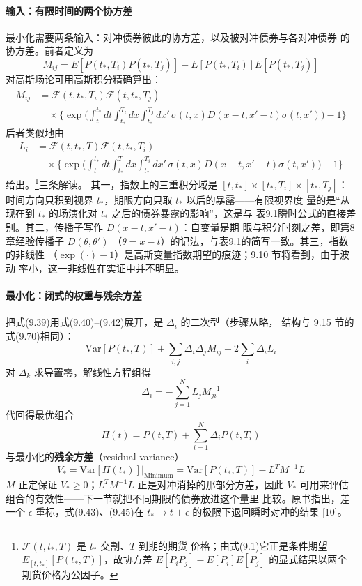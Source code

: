 \paragraph{输入：有限时间的两个协方差}
最小化需要两条输入：对冲债券彼此的协方差，以及被对冲债券与各对冲债券
的协方差。前者定义为
\begin{equation*}
M_{ij}=E[P(t_*,T_i)P(t_*,T_j)]-E[P(t_*,T_i)]E[P(t_*,T_j)]\tag{9.40}
\end{equation*}
对高斯场论可用高斯积分精确算出：
\begin{align*}
M_{ij}&=\mathcal{F}(t,t_*,T_i)\mathcal{F}(t,t_*,T_j)\\
&\quad\times\biggl\{\exp\biggl(\int_{t}^{t_*}dt\int_{t_*}^{T_i}dx
\int_{t_*}^{T_j}dx'\,\sigma(t,x)D(x-t,x'-t)\sigma(t,x')\biggr)-1\biggr\}
\tag{9.41}
\end{align*}
后者类似地由
\begin{align*}
L_i&=\mathcal{F}(t,t_*,T)\mathcal{F}(t,t_*,T_i)\\
&\quad\times\biggl\{\exp\biggl(\int_{t}^{t_*}dt\int_{t_*}^{T}dx
\int_{t_*}^{T_i}dx'\,\sigma(t,x)D(x-t,x'-t)\sigma(t,x')\biggr)-1\biggr\}
\tag{9.42}
\end{align*}
给出。\footnote{$\mathcal{F}(t,t_*,T)$ 是 $t_*$ 交割、$T$ 到期的期货
价格；由式(9.1)它正是条件期望 $E_{[t,t_*]}[P(t_*,T)]$，故协方差
$E[P_iP_j]-E[P_i]E[P_j]$ 的显式结果以两个期货价格为公因子。}三条解读。
其一，指数上的三重积分域是 $[t,t_*]\times[t_*,T_i]\times[t_*,T_j]$：
时间方向只积到视界 $t_*$，期限方向只取 $t_*$ 以后的暴露——有限视界度
量的是“从现在到 $t_*$ 的场演化对 $t_*$ 之后的债券暴露的影响”，这是与
表9.1瞬时公式的直接差别。其二，传播子写作 $D(x-t,x'-t)$：自变量是期
限与积分时刻之差，即第8章经验传播子 $D(\theta,\theta')$
（$\theta=x-t$）的记法，与表9.1的简写一致。其三，指数的非线性
（$\exp(\cdot)-1$）是高斯变量指数期望的痕迹；9.10 节将看到，由于波动
率小，这一非线性在实证中并不明显。

\paragraph{最小化：闭式的权重与残余方差}
把式(9.39)用式(9.40)--(9.42)展开，是 $\Delta_i$ 的二次型（步骤从略，
结构与 9.15 节的式(9.70)相同）：
\begin{equation*}
\mathrm{Var}[P(t_*,T)]+\sum_{i,j}\Delta_i\Delta_jM_{ij}
+2\sum_i\Delta_iL_i
\end{equation*}
对 $\Delta_k$ 求导置零，解线性方程组得
\begin{equation*}
\Delta_i=-\sum_{j=1}^{N}L_jM^{-1}_{ji}\tag{9.43}
\end{equation*}
代回得最优组合
\begin{equation*}
\Pi(t)=P(t,T)+\sum_{i=1}^{N}\Delta_iP(t,T_i)\tag{9.44}
\end{equation*}
与最小化的\textbf{残余方差}（residual variance）
\begin{equation*}
V_*=\mathrm{Var}[\Pi(t_*)]\Big|_{\mathrm{Minimum}}
=\mathrm{Var}[P(t_*,T)]-L^{T}M^{-1}L\tag{9.45}
\end{equation*}
$M$ 正定保证 $V_*\ge0$；$L^{T}M^{-1}L$ 正是对冲消掉的那部分方差，因此
$V_*$ 可用来评估组合的有效性——下一节就把不同期限的债券放进这个量里
比较。原书指出，差一个 $\epsilon$ 重标，式(9.43)、(9.45)在
$t_*\to t+\epsilon$ 的极限下退回瞬时对冲的结果 [10]。

